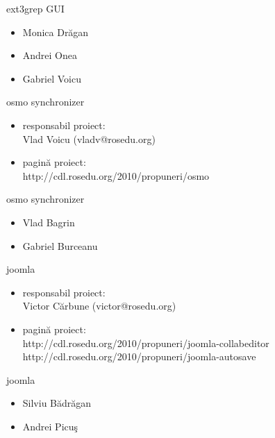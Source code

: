 \documentclass{beamer}
\begin{document}
\begin{frame}{ext3grep GUI}
  \begin{itemize} %
  \pause
  \item Monica Drăgan
  \pause
  \item Andrei Onea
  \pause
  \item Gabriel Voicu
  \end{itemize}
\end{frame}

\begin{frame}{osmo synchronizer}
  \begin{itemize} %
  \pause
  \item responsabil proiect: \\ Vlad Voicu (vladv@rosedu.org)
  \pause
  \item pagină proiect: \\ http://cdl.rosedu.org/2010/propuneri/osmo
  \end{itemize}
\end{frame}

\begin{frame}{osmo synchronizer}
  \begin{itemize} %
  \pause
  \item Vlad Bagrin
  \pause
  \item Gabriel Burceanu
  \end{itemize}
\end{frame}

\begin{frame}{joomla}
  \begin{itemize} %
  \pause
  \item responsabil proiect: \\ Victor Cărbune (victor@rosedu.org)
  \pause
  \item pagină proiect: \\ http://cdl.rosedu.org/2010/propuneri/joomla-collabeditor \\ http://cdl.rosedu.org/2010/propuneri/joomla-autosave
  \end{itemize}
\end{frame}

\begin{frame}{joomla}
  \begin{itemize} %
  \pause
  \item Silviu Bădrăgan
  \pause
  \item Andrei Picuş
  \end{itemize}
\end{frame}
\end{document}
